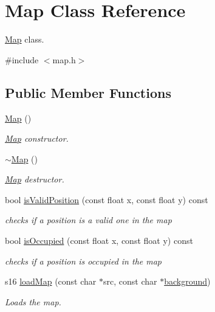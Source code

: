 \hypertarget{class_map}{}\section{Map Class Reference}
\label{class_map}


\mbox{\hyperlink{class_map}{Map}} class.  




{\ttfamily \#include $<$map.\+h$>$}

\subsection*{Public Member Functions}
\begin{DoxyCompactItemize}
\item 
\mbox{\hyperlink{class_map_a0f5ad0fd4563497b4214038cbca8b582}{Map}} ()
\begin{DoxyCompactList}\small\item\em \mbox{\hyperlink{class_map}{Map}} constructor. \end{DoxyCompactList}\item 
\mbox{\hyperlink{class_map_aa403fbe09394ccf39747588f5168e3b2}{$\sim$\+Map}} ()
\begin{DoxyCompactList}\small\item\em \mbox{\hyperlink{class_map}{Map}} destructor. \end{DoxyCompactList}\item 
bool \mbox{\hyperlink{class_map_a5b5c0989800c44a2db7a00bbf40c74a6}{is\+Valid\+Position}} (const float x, const float y) const
\begin{DoxyCompactList}\small\item\em checks if a position is a valid one in the map \end{DoxyCompactList}\item 
bool \mbox{\hyperlink{class_map_abc5d67212c69d40198e80f66e29cca7a}{is\+Occupied}} (const float x, const float y) const
\begin{DoxyCompactList}\small\item\em checks if a position is occupied in the map \end{DoxyCompactList}\item 
s16 \mbox{\hyperlink{class_map_a4070d04487b207e04c47b89b710c95a6}{load\+Map}} (const char $\ast$src, const char $\ast$\mbox{\hyperlink{class_map_ad2be03ca3f10013e1017c0ad4903641b}{background}})
\begin{DoxyCompactList}\small\item\em Loads the map. \end{DoxyCompactList}\item 

\end{DoxyCompactItemize}
